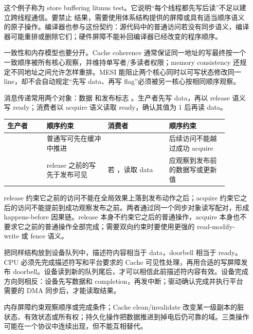 这个例子称为 store buffering litmus test。它说明“每个线程都先写后读”不足以建立跨线程通信。要禁止  结果，需要使用体系结构提供的屏障或具有适当顺序语义的原子操作。编译器也参与这份契约：源代码中的普通访问若没有同步语义，编译器可能重排或删除它们；硬件屏障不能补回编译器已经改变的程序顺序。

一致性和内存模型也要分开。Cache coherence 通常保证同一地址的写最终按一个一致顺序被所有核心观察，并维持单写者/多读者权限；memory consistency 还规定不同地址之间允许怎样重排。MESI 能阻止两个核心同时以可写状态修改同一 line，却不会自动规定“先写 data、再写 flag”必须被另一核心按相同顺序观察。


消息传递常用两个对象：数据  和发布标志 。生产者先写 data，再以 release 语义写 ready；消费者以 acquire 语义读取 ready，确认其值为 1 后再读 data。

\begin{longtable}{L{0.16\linewidth}L{0.25\linewidth}L{0.25\linewidth}L{0.24\linewidth}}
\toprule
生产者 & 顺序约束 & 消费者 & 顺序约束 \\
\midrule
{} & 普通写可先在缓冲中推进 &  & 后续访问不能越过成功 acquire \\\tablerowrule
{} & release 之前的写先于发布可见 & 若 ，读取 data & 应观察到发布前的数据写或更新值 \\
\bottomrule
\end{longtable}

release 约束它之前的访问不能在全局效果上落到发布动作之后；acquire 约束它之后的访问不能提前到成功观察发布之前。两者通过同一个同步对象读写配对，形成 happens-before 因果链。release 本身不约束它之后的普通操作，acquire 本身也不要求它之前的普通操作全部完成；需要双向约束时要使用更强的 read-modify-write 或 fence 语义。

把同样结构放到设备队列中，描述符内容相当于 data，doorbell 相当于 ready。CPU 必须先完成描述符写和平台要求的 Cache 可见性处理，再用合适的写屏障发布 doorbell。设备读到新的队列尾后，才可以相信此前描述符内容有效。设备完成方向则相反：设备先写数据和 completion，再发中断；驱动确认完成并执行平台需要的 DMA 同步后，才能读取结果。


内存屏障约束观察顺序或完成条件；Cache clean/invalidate 改变某一级副本的脏状态、有效状态或所有权；持久化操作把数据推进到掉电后仍可靠的域。三类操作可能在一个协议中连续出现，但不能互相替代。

